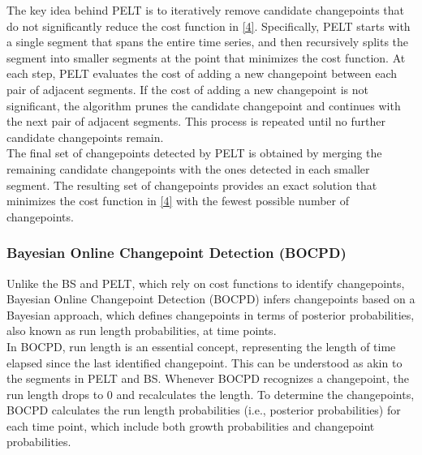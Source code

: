 \documentclass[]{interact}
\theoremstyle{plain}%
\theoremstyle{definition}
\theoremstyle{remark}
\begin{document}
{	The key idea behind PELT is to iteratively remove candidate changepoints that do not significantly reduce the cost function in \autoref{4}. Specifically, PELT starts with a single segment that spans the entire time series, and then recursively splits the segment into smaller segments at the point that minimizes the cost function\cite{chapmanMetaAnalysisMetricsChange}. At each step, PELT evaluates the cost of adding a new changepoint between each pair of adjacent segments. If the cost of adding a new changepoint is not significant, the algorithm prunes the candidate changepoint and continues with the next pair of adjacent segments. This process is repeated until no further candidate changepoints remain. \\
	
	The final set of changepoints detected by PELT is obtained by merging the remaining candidate changepoints with the ones detected in each smaller segment. The resulting set of changepoints provides an exact solution that minimizes the cost function in \autoref{4} with the fewest possible number of changepoints.
	
	\subsubsection{Bayesian Online Changepoint Detection (BOCPD)}
	
	
	\hspace{0.27cm} Unlike the BS and PELT, which rely on cost functions to identify changepoints, Bayesian Online Changepoint Detection (BOCPD) infers changepoints based on a Bayesian approach, which defines changepoints in terms of posterior probabilities, also known as run length probabilities, at time points. \\
	
	In BOCPD, run length is an essential concept, representing the length of time elapsed since the last identified changepoint. This can be understood as akin to the segments in PELT and BS. Whenever BOCPD recognizes a changepoint, the run length drops to 0 and recalculates the length. To determine the changepoints, BOCPD calculates the run length probabilities (i.e., posterior probabilities) for each time point, which include both growth probabilities and changepoint probabilities. \\
	
}
\end{document}
